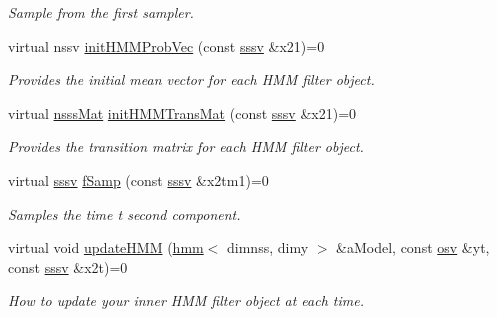 \begin{DoxyCompactItemize}
\begin{DoxyCompactList}\small\item\em Sample from the first sampler. \end{DoxyCompactList}\item 
virtual nssv \hyperlink{classrbpf__hmm__bs_a01e930554f9a7d847dbe2be4c49db4db}{init\+H\+M\+M\+Prob\+Vec} (const \hyperlink{classrbpf__hmm__bs_aba47e4a45bf4ac6913f4419f9512f97f}{sssv} \&x21)=0
\begin{DoxyCompactList}\small\item\em Provides the initial mean vector for each H\+MM filter object. \end{DoxyCompactList}\item 
virtual \hyperlink{classrbpf__hmm__bs_a1bd1ebb6af375d962ba266b4ed5434a1}{nsss\+Mat} \hyperlink{classrbpf__hmm__bs_a74f41ca3dae17f4dc1962fb61b489038}{init\+H\+M\+M\+Trans\+Mat} (const \hyperlink{classrbpf__hmm__bs_aba47e4a45bf4ac6913f4419f9512f97f}{sssv} \&x21)=0
\begin{DoxyCompactList}\small\item\em Provides the transition matrix for each H\+MM filter object. \end{DoxyCompactList}\item 
virtual \hyperlink{classrbpf__hmm__bs_aba47e4a45bf4ac6913f4419f9512f97f}{sssv} \hyperlink{classrbpf__hmm__bs_a2edca3ded3bbb34f67303f5cc9e40170}{f\+Samp} (const \hyperlink{classrbpf__hmm__bs_aba47e4a45bf4ac6913f4419f9512f97f}{sssv} \&x2tm1)=0
\begin{DoxyCompactList}\small\item\em Samples the time t second component. \end{DoxyCompactList}\item 
virtual void \hyperlink{classrbpf__hmm__bs_ae183b5747ec63cd61031e8bbbfe5fb82}{update\+H\+MM} (\hyperlink{classhmm}{hmm}$<$ dimnss, dimy $>$ \&a\+Model, const \hyperlink{classrbpf__hmm__bs_a9a830ec4bbd37d4922011165aa5a8037}{osv} \&yt, const \hyperlink{classrbpf__hmm__bs_aba47e4a45bf4ac6913f4419f9512f97f}{sssv} \&x2t)=0
\begin{DoxyCompactList}\small\item\em How to update your inner H\+MM filter object at each time. \end{DoxyCompactList}\end{DoxyCompactItemize}
